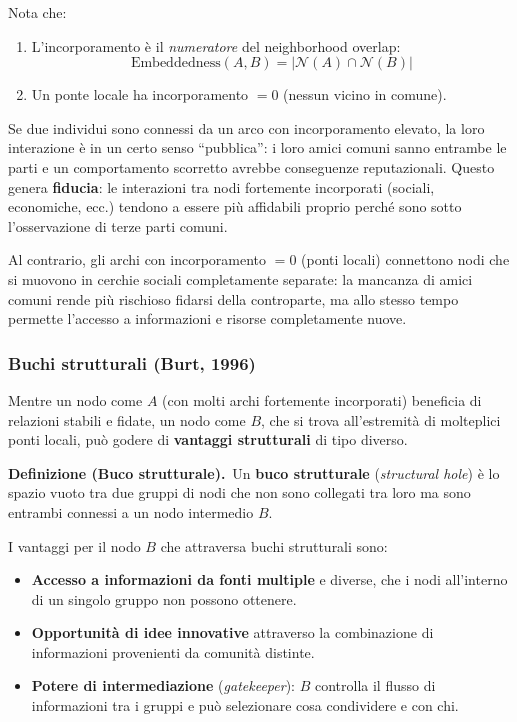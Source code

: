 \documentclass[12pt,a4paper]{article}
\newcommand{\definition}[2]{%
  \vspace{4pt}%
  \noindent\textbf{Definizione (#1).}\ #2\par\vspace{4pt}%
}
\begin{document}
Nota che:
\begin{enumerate}
  \item L'incorporamento è il \emph{numeratore} del neighborhood overlap:
    \[
      \text{Embeddedness}(A,B) = |\mathcal{N}(A) \cap \mathcal{N}(B)|
    \]
  \item Un ponte locale ha incorporamento $= 0$ (nessun vicino in comune).
\end{enumerate}

Se due individui sono connessi da un arco con incorporamento elevato, la loro
interazione è in un certo senso ``pubblica'': i loro amici comuni sanno entrambe le
parti e un comportamento scorretto avrebbe conseguenze reputazionali. Questo genera
\textbf{fiducia}: le interazioni tra nodi fortemente incorporati (sociali, economiche,
ecc.) tendono a essere più affidabili proprio perché sono sotto l'osservazione di
terze parti comuni.

Al contrario, gli archi con incorporamento $= 0$ (ponti locali) connettono nodi
che si muovono in cerchie sociali completamente separate: la mancanza di amici comuni
rende più rischioso fidarsi della controparte, ma allo stesso tempo permette
l'accesso a informazioni e risorse completamente nuove.

\subsubsection{Buchi strutturali (Burt, 1996)}

Mentre un nodo come $A$ (con molti archi fortemente incorporati) beneficia di
relazioni stabili e fidate, un nodo come $B$, che si trova all'estremità di molteplici
ponti locali, può godere di \textbf{vantaggi strutturali} di tipo diverso.

\definition{Buco strutturale}{Un \textbf{buco strutturale} (\textit{structural hole})
è lo spazio vuoto tra due gruppi di nodi che non sono collegati tra loro ma sono entrambi
connessi a un nodo intermedio $B$.}

I vantaggi per il nodo $B$ che attraversa buchi strutturali sono:
\begin{itemize}
  \item \textbf{Accesso a informazioni da fonti multiple} e diverse, che i nodi
        all'interno di un singolo gruppo non possono ottenere.
  \item \textbf{Opportunità di idee innovative} attraverso la combinazione di
        informazioni provenienti da comunità distinte.
  \item \textbf{Potere di intermediazione} (\textit{gatekeeper}): $B$ controlla il
        flusso di informazioni tra i gruppi e può selezionare cosa condividere e con chi.
\end{itemize}
\end{document}

